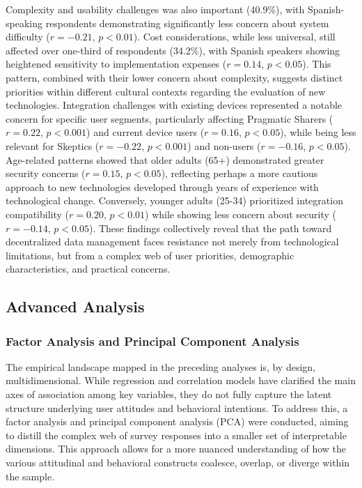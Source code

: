 		Complexity and usability challenges was also important (40.9\%), with Spanish-speaking respondents demonstrating significantly less concern about system difficulty ($r = -0.21$, $p < 0.01$). 
		Cost considerations, while less universal, still affected over one-third of respondents (34.2\%), with Spanish speakers showing heightened sensitivity to implementation expenses ($r = 0.14$, $p < 0.05$). This pattern, combined with their lower concern about complexity, suggests distinct priorities within different cultural contexts regarding the evaluation of new technologies.
		Integration challenges with existing devices represented a notable concern for specific user segments, particularly affecting Pragmatic Sharers ($r = 0.22$, $p < 0.001$) and current device users ($r = 0.16$, $p < 0.05$), while being less relevant for Skeptics ($r = -0.22$, $p < 0.001$) and non-users ($r = -0.16$, $p < 0.05$). 
		Age-related patterns showed that older adults (65+) demonstrated greater security concerns ($r = 0.15$, $p < 0.05$), reflecting perhaps a more cautious approach to new technologies developed through years of experience with technological change. Conversely, younger adults (25-34) prioritized integration compatibility ($r = 0.20$, $p < 0.01$) while showing less concern about security ($r = -0.14$, $p < 0.05$).
		These findings collectively reveal that the path toward decentralized data management faces resistance not merely from technological limitations, but from a complex web of user priorities, demographic characteristics, and practical concerns.
\subsection{Advanced Analysis}
	\subsubsection{Factor Analysis and Principal Component Analysis}
	The empirical landscape mapped in the preceding analyses is, by design, multidimensional. While regression and correlation models have clarified the main axes of association among key variables, they do not fully capture the latent structure underlying user attitudes and behavioral intentions. To address this, a factor analysis and principal component analysis (PCA) were conducted, aiming to distill the complex web of survey responses into a smaller set of interpretable dimensions. This approach allows for a more nuanced understanding of how the various attitudinal and behavioral constructs coalesce, overlap, or diverge within the sample.


